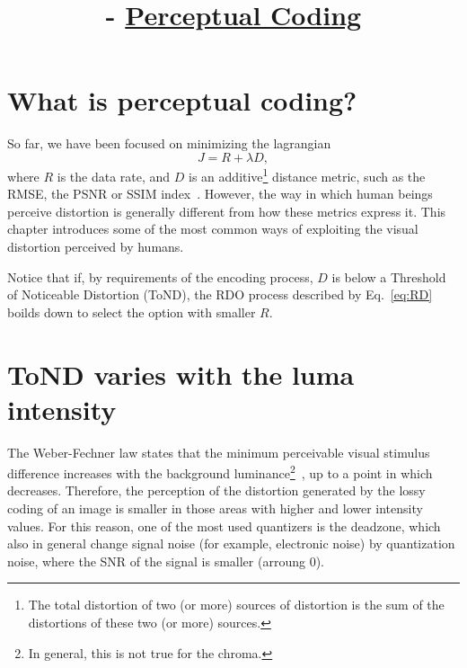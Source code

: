 

\title{\SM{} - \href{https://github.com/Sistemas-Multimedia/Sistemas-Multimedia.github.io/tree/master/contents/perceptual_coding}{Perceptual Coding}}

\maketitle
\tableofcontents

\section{What is perceptual coding?}

So far, we have been focused on minimizing the
lagrangian~\cite{sullivan1998rate}
\begin{equation}
  J = R + \lambda D,
  \label{eq:RD}
\end{equation}
where $R$ is the data rate, and $D$ is an additive\footnote{The total
distortion of two (or more) sources of distortion is the sum of the
distortions of these two (or more) sources.} distance metric, such as
the RMSE, the PSNR or SSIM index~\cite{wang2004image}. However, the
way in which human beings perceive distortion is generally different
from how these metrics express it. This chapter introduces some of the
most common ways of exploiting the visual distortion perceived by
humans.

Notice that if, by requirements of the encoding process, $D$ is below
a Threshold of Noticeable Distortion (ToND), the RDO process described
by Eq.~\eqref{eq:RD} boilds down to select the option with smaller $R$.

\section{ToND varies with the luma intensity}

The Weber-Fechner law states that the minimum perceivable visual
stimulus difference increases with the background
luminance\footnote{In general, this is not true for the
chroma.}~\cite{naccari2014perceptually}, up to a point in which
decreases. Therefore, the perception of the distortion generated by
the lossy coding of an image is smaller in those areas with higher and
lower intensity values. For this reason, one of the most used
quantizers is the deadzone, which also in general change signal noise
(for example, electronic noise) by quantization noise, where the SNR
of the signal is smaller (arroung 0).

